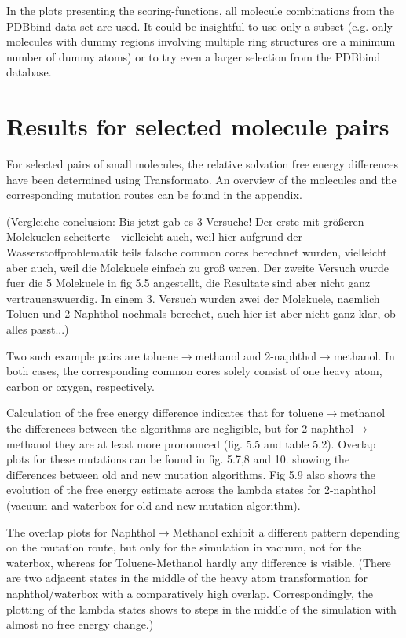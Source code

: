 In the plots presenting the scoring-functions, all molecule combinations
from the PDBbind data set are used. It could be insightful to use
only a subset (e.g. only molecules with dummy regions involving multiple
ring structures ore a minimum number of dummy atoms) or to try even a larger selection from the PDBbind database.

\section{Results for selected molecule pairs}

For selected pairs of small molecules, the relative solvation free energy differences have been determined using Transformato. 
An overview of the molecules and the corresponding mutation routes can be found in the appendix.

 {\color{red} (Vergleiche conclusion: Bis jetzt gab es 3 Versuche! Der erste mit größeren Molekuelen scheiterte - vielleicht auch, weil hier aufgrund der Wasserstoffproblematik teils falsche common cores berechnet wurden, vielleicht aber auch, weil die Molekuele einfach zu groß waren. Der zweite Versuch wurde fuer die 5 Molekuele in fig 5.5 angestellt, die Resultate sind aber nicht ganz vertrauenswuerdig. In einem 3. Versuch wurden zwei der Molekuele, naemlich Toluen und 2-Naphthol nochmals berechet, auch hier ist aber nicht ganz klar, ob alles passt...)}
 
Two such example pairs are toluene$\rightarrow$methanol and 2-naphthol$\rightarrow$methanol. In both cases, the corresponding common cores solely consist of one heavy atom, carbon or oxygen, respectively.

Calculation of the free energy difference indicates that for toluene$ 	\rightarrow $methanol the differences between the algorithms are negligible, but for 2-naphthol$ 	\rightarrow $methanol they are at least more pronounced (fig. 5.5 and table 5.2). 
Overlap plots for these mutations can be found in fig. 5.7,8 and 10. showing the differences between old and new mutation algorithms. Fig 5.9 also shows the evolution of the free energy estimate across the lambda states for 2-naphthol (vacuum and waterbox for old and new mutation algorithm).

The overlap plots for Naphthol$\rightarrow$Methanol exhibit a different pattern depending on the mutation route, but only for the simulation in vacuum, not for the waterbox, whereas for Toluene-Methanol hardly any difference is visible. (There are two adjacent states in the middle of the heavy atom transformation for naphthol/waterbox with a comparatively high overlap. Correspondingly, the plotting of the lambda states shows to steps in the middle of the simulation with almost no free energy change.)

